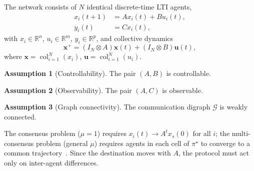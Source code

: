 \documentclass[final,5p,times]{elsarticle}
\theoremstyle{plain}
\theoremstyle{definition}
\newtheorem{assumption}{Assumption}
\theoremstyle{remark}
\DeclareMathOperator{\col}{col}
\newcommand{\R}{\mathbb{R}}
\newcommand{\bx}{\boldsymbol{x}}
\newcommand{\bu}{\boldsymbol{u}}
\begin{document}
The network consists of $N$ identical discrete-time LTI agents,
\begin{align}
x_i(t+1) &= A x_i(t) + B u_i(t), \label{eq:agent_state} \\
y_i(t) &= C x_i(t), \label{eq:agent_output}
\end{align}
with $x_i \in \R^n$, $u_i \in \R^m$, $y_i \in \R^p$, and collective dynamics
\begin{equation}
\bx^+ = (I_N \otimes A)\bx(t) + (I_N \otimes B)\bu(t),
\label{eq:collective}
\end{equation}
where $\bx = \col_{i=1}^N(x_i)$, $\bu = \col_{i=1}^N(u_i)$.
\begin{assumption}[Controllability]
\label{ass:controllable}
The pair $(A, B)$ is controllable.
\end{assumption}
\begin{assumption}[Observability]
\label{ass:observable}
The pair $(A, C)$ is observable.
\end{assumption}
\begin{assumption}[Graph connectivity]
\label{ass:graph}
The communication digraph $\mathcal{G}$ is weakly connected.
\end{assumption}
The consensus problem ($\mu = 1$) requires $x_i(t) \to A^t x_s(0)$ for all $i$; the multi-consensus problem (general $\mu$) requires agents in each cell of $\pi^\star$ to converge to a common trajectory~\cite{cacace2024}. Since the destination moves with $A$, the protocol must act only on inter-agent differences.
\end{document}
